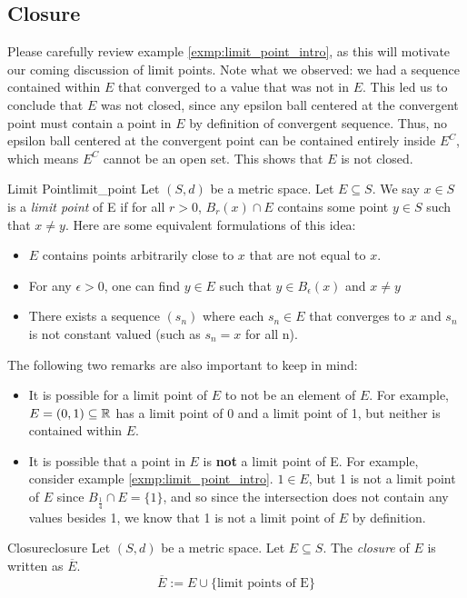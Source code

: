 




\subsection{Closure}
Please carefully review example \ref{exmp:limit_point_intro}, as this will motivate our coming discussion of limit points. Note what we observed: we had a sequence contained within \(E\) that converged to a value that was not in \(E\). This led us to conclude that \(E\) was not closed, since any epsilon ball centered at the convergent point must contain a point in \(E\) by definition of convergent sequence. Thus, no epsilon ball centered at the convergent point can be contained entirely inside \(E^C\), which means \(E^C\) cannot be an open set. This shows that \(E\) is not closed. 
\begin{defn}{Limit Point}{limit_point}
Let \((S, d)\) be a metric space. Let \(E \subseteq S\). We say \(x \in S\) is a \textit{limit point} of E if for all \(r > 0\), \(B_r(x) \cap E\) contains some point \(y \in S\) such that \(x \not = y\). Here are some equivalent formulations of this idea:
	\begin{itemize}
  		\item \(E\) contains points arbitrarily close to \(x\) that are not equal to \(x\).  
  		\item For any \(\epsilon > 0\), one can find \(y \in E\) such that \(y \in B_{\epsilon}(x)\) and \(x \not = y\)
  		\item There exists a sequence \((s_n)\) where each \(s_n \in E\) that converges to \(x\) and \(s_n\) is not constant valued (such as \(s_n = x\) for all n).
	\end{itemize}
The following two remarks are also important to keep in mind: 
\begin{itemize}
  \item It is possible for a limit point of \(E\) to not be an element of \(E\). For example, \(E = (0, 1) \subseteq {\mathbb R}\) has a limit point of 0 and a limit point of 1, but neither is contained within \(E\).
  \item It is possible that a point in \(E\) is \textbf{not} a limit point of E. For example, consider example \ref{exmp:limit_point_intro}. \(1 \in E\), but 1 is not a limit point of \(E\) since \(B_{\frac{1}{4}} \cap E = \{1\}\), and so since the intersection does not contain any values besides 1, we know that 1 is not a limit point of \(E\) by definition. 
\end{itemize}


\end{defn}
\begin{defn}{Closure}{closure}
Let \((S, d)\) be a metric space. Let \(E \subseteq S\). The \textit{closure} of \(E\) is written as \(\overline{E}\). 
\begin{equation*}
  \overline{E} := E \cup \{\textrm{limit points of E}\}
\end{equation*}

\end{defn}


